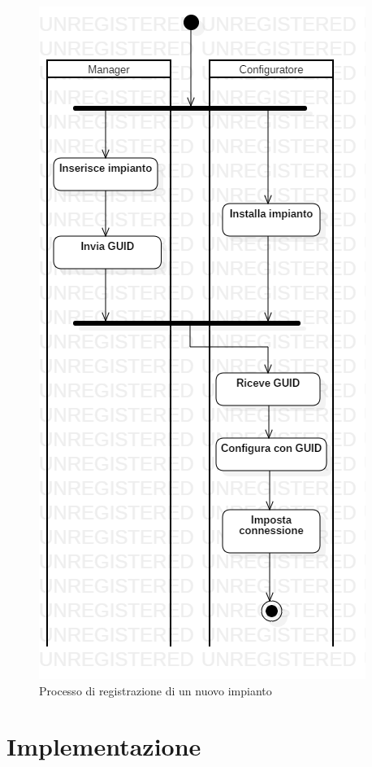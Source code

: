 \documentclass[12pt]{article}
\begin{document}
\begin{figure}[h!]
\centering
  \includegraphics[scale=0.55]{img/activity_registration.png}
  \caption{Processo di registrazione di un nuovo impianto}
\end{figure}
\newpage

\section{Implementazione}\label{sec:implementazione}
\end{document}
